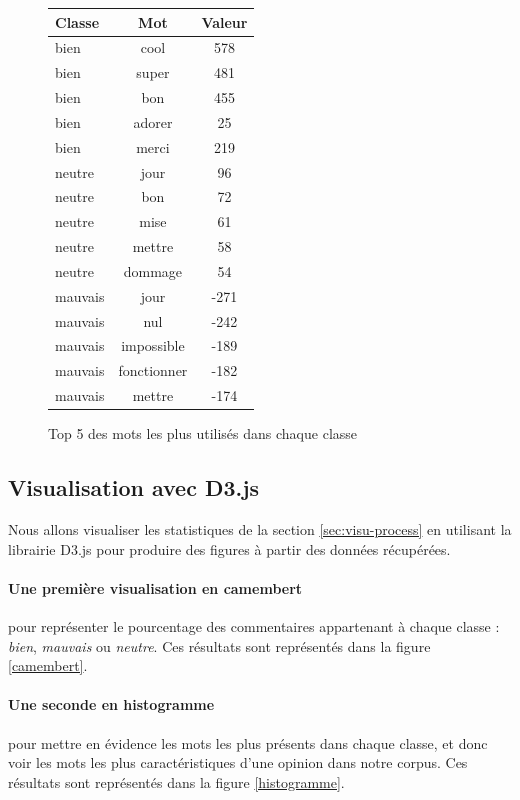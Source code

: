 \documentclass[a4paper, 11pt]{article}
\begin{document}
\begin{figure}[h]
\begin{center}


\begin{tabular}{|l|c|c|}
\hline
Classe &	Mot&	Valeur\\
\hline
\hline
bien&	cool&	578\\
\hline
bien&	super&	481\\
\hline
bien&	bon	&455\\
\hline
bien&	adorer&	25\\
\hline
bien&	merci&	219\\
\hline
\hline
neutre&	jour&	96\\
\hline
neutre&	bon	&72\\
\hline
neutre&	mise&	61\\
\hline
neutre&	mettre&	58\\
\hline
neutre&	dommage	&54\\
\hline
\hline
mauvais&	jour&	-271\\
\hline
mauvais	&nul	&-242\\
\hline
mauvais	&impossible	&-189\\
\hline
mauvais	&fonctionner&	-182\\
\hline
mauvais	&mettre&	-174\\
\hline
\end{tabular}
\end{center}
\caption{Top 5 des mots les plus utilisés dans chaque classe}
\label{mots les plus utilisés}
\end{figure}
 
\subsection{Visualisation avec D3.js}
 
Nous allons visualiser les statistiques de la section \ref{sec:visu-process} en utilisant la librairie D3.js pour produire des figures à partir des données récupérées.
 
\paragraph{Une première visualisation en camembert}pour représenter le pourcentage des commentaires appartenant à chaque classe : \textit{bien}, \textit{mauvais} ou \textit{neutre}. Ces résultats sont représentés dans la figure \ref{camembert}.\\
\paragraph{Une seconde en histogramme}pour mettre en évidence les mots les plus présents dans chaque classe, et donc voir les mots les plus caractéristiques d'une opinion dans notre corpus. Ces résultats sont représentés dans la figure \ref{histogramme}.
\end{document}
